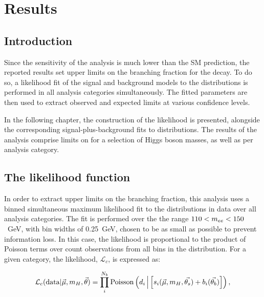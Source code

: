 
\chapter{Results}
\label{chap:results}

\section{Introduction}

Since the sensitivity of the analysis is much lower than the SM prediction, the reported results set upper limits on the branching fraction for the \Hee decay. To do so, a likelihood fit of the signal and background models to the \mee distributions is performed in all analysis categories simultaneously. The fitted parameters are then used to extract observed and expected limits at various confidence levels. 

In the following chapter, the construction of the likelihood is presented, alongside the corresponding signal-plus-background fits to \mee distributions. The results of the analysis comprise limits on \BHee for a selection of Higgs boson masses, as well as per analysis category.


\section{The likelihood function}
In order to extract upper limits on the \Hee branching fraction, this analysis uses a binned simultaneous maximum likelihood fit to the \mee distributions in data over all analysis categories.
The fit is performed over the the range $110<m_{ee}<150$~GeV, with bin widths of 0.25~GeV, chosen to be as small as possible to prevent information loss. In this case, the likelihood is proportional to the product of Poisson terms over count observations from all bins in the \mee distribution. For a given category, the likelihood, $\mathcal{L}_{c}$, is expressed as: %

\begin{equation}
    \mathcal{L}_{c}(\mathrm{data}|\vec{\mu},m_{H},\vec{\theta}) = \prod_{i}^{N_{b}} \mathrm{Poisson} \left( d_{i} \, \Big| \left[ s_{i}(\vec{\mu},m_{H},\vec{\theta_{s}}) + b_{i}(\vec{\theta_{b}}) \right] \right),
\end{equation}

